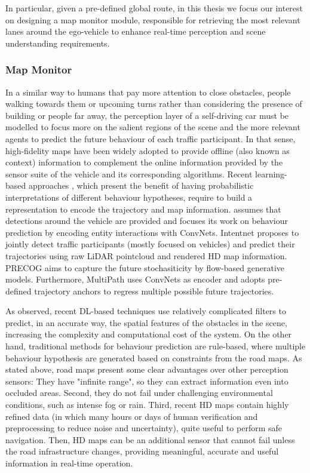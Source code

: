 In particular, given a pre-defined global route, in this thesis we focus our interest on designing a map monitor module, responsible for retrieving the most relevant lanes around the ego-vehicle to enhance real-time perception and scene understanding requirements.

\subsubsection{Map Monitor}
\label{subsubsec:4_smartmot_mapmonitor}

In a similar way to humans that pay more attention to close obstacles, people walking towards them or upcoming turns rather than considering the presence of building or people far away, the perception layer of a self-driving car must be modelled to focus more on the salient regions of the scene \cite{sadeghian2019sophie} and the more relevant agents to predict the future behaviour of each traffic participant. In that sense, high-fidelity maps have been widely adopted to provide offline (also known as context) information to complement the online information provided by the sensor suite of the vehicle and its corresponding algorithms. Recent learning-based approaches \cite{hong2019rules} \cite{chai2019multipath} \cite{gao2020vectornet} \cite{casas2018intentnet}, which present the benefit of having probabilistic interpretations of different behaviour hypotheses, require to build a representation to encode the trajectory and map information. \cite{hong2019rules} assumes that detections around the vehicle are provided and focuses its work on behaviour prediction by encoding entity interactions with ConvNets. Intentnet \cite{casas2018intentnet} proposes to jointly detect traffic participants (mostly focused on vehicles) and predict their trajectories using raw LiDAR pointcloud and rendered HD map information. PRECOG \cite{rhinehart2019precog} aims to capture the future stochasiticity by flow-based generative models. Furthermore, MultiPath \cite{chai2019multipath} uses ConvNets as encoder and adopts pre-defined trajectory anchors to regress multiple possible future trajectories. 

As observed, recent \ac{DL}-based techniques use relatively complicated filters to predict, in an accurate way, the spatial features of the obstacles in the scene, increasing the complexity and computational cost of the system. On the other hand, traditional methods for behaviour prediction are rule-based, where multiple behaviour hypothesis are generated based on constraints from the road maps. As stated above, road maps present some clear advantages over other perception sensors: They have "infinite range", so they can extract information even into occluded areas. Second, they do not fail under challenging environmental conditions, such as intense fog or rain. Third, recent HD maps contain highly refined data (in which many hours or days of human verification and preprocessing to reduce noise and uncertainty), quite useful to perform safe navigation. Then, HD maps can be an additional sensor that cannot fail unless the road infrastructure changes, providing meaningful, accurate and useful information in real-time operation.  

